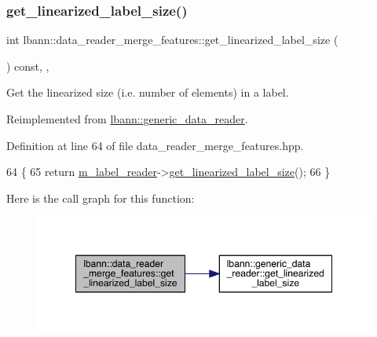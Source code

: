 \subsubsection{\texorpdfstring{get\+\_\+linearized\+\_\+label\+\_\+size()}{get\_linearized\_label\_size()}}
{\footnotesize\ttfamily int lbann\+::data\+\_\+reader\+\_\+merge\+\_\+features\+::get\+\_\+linearized\+\_\+label\+\_\+size (\begin{DoxyParamCaption}{ }\end{DoxyParamCaption}) const\hspace{0.3cm}{\ttfamily [inline]}, {\ttfamily [override]}, {\ttfamily [virtual]}}



Get the linearized size (i.\+e. number of elements) in a label. 



Reimplemented from \hyperlink{classlbann_1_1generic__data__reader_a99e8ba4f09fdc86d238ad7c8d2e2bce0}{lbann\+::generic\+\_\+data\+\_\+reader}.



Definition at line 64 of file data\+\_\+reader\+\_\+merge\+\_\+features.\+hpp.


\begin{DoxyCode}
64                                                  \{
65     \textcolor{keywordflow}{return} \hyperlink{classlbann_1_1data__reader__merge__features_a1e54a136c63b934f44ff91dc68ea3b27}{m\_label\_reader}->\hyperlink{classlbann_1_1generic__data__reader_a99e8ba4f09fdc86d238ad7c8d2e2bce0}{get\_linearized\_label\_size}();
66   \}
\end{DoxyCode}
Here is the call graph for this function\+:\nopagebreak
\begin{figure}[H]
\begin{center}
\leavevmode
\includegraphics[width=349pt]{classlbann_1_1data__reader__merge__features_aa50959f29f761916a3cef60f33740516_cgraph}
\end{center}
\end{figure}
\mbox{\label{classlbann_1_1data__reader__merge__features_a63be746ea35e664b5cc8f8b973e86209}} 

